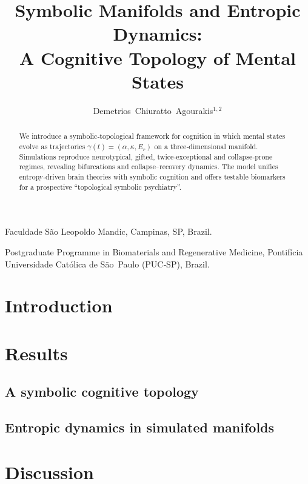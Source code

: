 \documentclass{nature}             %
\title{Symbolic Manifolds and Entropic Dynamics: \\ A Cognitive Topology of Mental States}
\author{Demetrios Chiuratto Agourakis$^{1,2}$}
\begin{document}
\maketitle

\begin{affiliations}
 \item Faculdade São Leopoldo Mandic, Campinas, SP, Brazil.
 \item Postgraduate Programme in Biomaterials and Regenerative Medicine, Pontifícia Universidade Católica de São Paulo (PUC‑SP), Brazil.
\end{affiliations}

\begin{abstract}
We introduce a symbolic‐topological framework for cognition in which mental states evolve as trajectories $\gamma(t)= (\alpha,\kappa,E_r)$ on a three‑dimensional manifold. Simulations reproduce neurotypical, gifted, twice‑exceptional and collapse‑prone regimes, revealing bifurcations and collapse–recovery dynamics. The model unifies entropy‑driven brain theories with symbolic cognition and offers testable biomarkers for a prospective “topological symbolic psychiatry”.
\end{abstract}

\section*{Introduction}


\section*{Results}
\subsection*{A symbolic cognitive topology}


\subsection*{Entropic dynamics in simulated manifolds}


\section*{Discussion}

\end{document}
